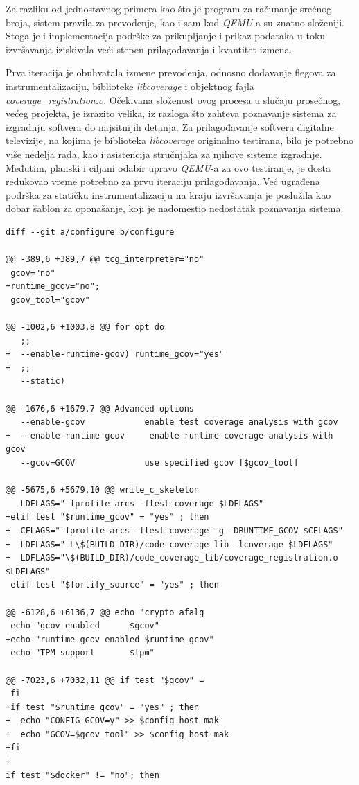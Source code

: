 \documentclass[12pt,oneside]{memoir}
\newcommand{\strano}[1]{\textit{#1}}
\begin{document}
Za razliku od jednostavnog primera kao što je program za računanje srećnog broja, sistem pravila za prevođenje, kao i sam kod \strano{QEMU}-a su znatno složeniji. Stoga je i implementacija podrške za prikupljanje i prikaz podataka u toku izvršavanja iziskivala veći stepen prilagođavanja i kvantitet izmena. 

Prva iteracija je obuhvatala izmene prevođenja, odnosno dodavanje flegova za instrumentalizaciju, biblioteke \strano{libcoverage} i objektnog fajla \strano{coverage\_registration.o}. 
Očekivana složenost ovog procesa u slučaju prosečnog, većeg projekta, je izrazito velika, iz razloga što zahteva poznavanje sistema za izgradnju softvera do najsitnijih detanja. Za prilagođavanje softvera digitalne televizije, na kojima je biblioteka \strano{libcoverage} originalno testirana, bilo je potrebno više nedelja rada, kao i asistencija stručnjaka za njihove sisteme izgradnje. Međutim, planski i ciljani odabir upravo \strano{QEMU}-a za ovo testiranje, je dosta redukovao vreme potrebno za prvu iteraciju prilagođavanja. Već ugrađena podrška za statičku instrumentalizaciju na kraju izvršavanja je poslužila kao dobar šablon za oponašanje, koji je nadomestio nedostatak poznavanja sistema. \\

\begin{lstlisting}[caption={Izmene skripte \strano{configure}},frame=single, label=qemu-diff-1]
diff --git a/configure b/configure

@@ -389,6 +389,7 @@ tcg_interpreter="no"
 gcov="no"
+runtime_gcov="no";
 gcov_tool="gcov"

@@ -1002,6 +1003,8 @@ for opt do
   ;;
+  --enable-runtime-gcov) runtime_gcov="yes"
+  ;;
   --static)

@@ -1676,6 +1679,7 @@ Advanced options 
   --enable-gcov            enable test coverage analysis with gcov
+  --enable-runtime-gcov     enable runtime coverage analysis with gcov
   --gcov=GCOV              use specified gcov [$gcov_tool]

@@ -5675,6 +5679,10 @@ write_c_skeleton
   LDFLAGS="-fprofile-arcs -ftest-coverage $LDFLAGS"
+elif test "$runtime_gcov" = "yes" ; then
+  CFLAGS="-fprofile-arcs -ftest-coverage -g -DRUNTIME_GCOV $CFLAGS"
+  LDFLAGS="-L\$(BUILD_DIR)/code_coverage_lib -lcoverage $LDFLAGS"
+  LDFLAGS="\$(BUILD_DIR)/code_coverage_lib/coverage_registration.o $LDFLAGS"
 elif test "$fortify_source" = "yes" ; then
 
@@ -6128,6 +6136,7 @@ echo "crypto afalg      
 echo "gcov enabled      $gcov"
+echo "runtime gcov enabled $runtime_gcov"
 echo "TPM support       $tpm"

@@ -7023,6 +7032,11 @@ if test "$gcov" = 
 fi
+if test "$runtime_gcov" = "yes" ; then
+  echo "CONFIG_GCOV=y" >> $config_host_mak
+  echo "GCOV=$gcov_tool" >> $config_host_mak
+fi
+
if test "$docker" != "no"; then
\end{lstlisting}
\end{document}
